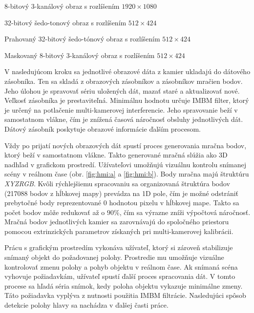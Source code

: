 \begin{description}[leftmargin=*, font=$\bullet$~\normalfont\scshape\color{black}]
	\item[RGB:] 	8-bitový 3-kanálový obraz s rozlíšením $1920 \times 1080$
	\item[IR:]	32-bitový šedo-tonový obraz s rozlíšením $512 \times 424$
	\item[Depth:] Prahovaný 32-bitový šedo-tónový obraz s rozlíšením $512 \times 424$
	\item[RGB-D:] Maskovaný 8-bitový 3-kanálový obraz s rozlíšením $512 \times 424$
\end{description}

V nasledujúcom kroku sa jednotlivé obrazové dáta z kamier ukladajú do dátového zásobníka. Ten sa skladá z obrazových zásobníkov a zásobníkov mračien bodov. Jeho úlohou je spravovať sériu uložených dát, mazať staré a aktualizovať nové. Veľkosť zásobníka je prestaviteľná. Minimálnu hodnotu určuje IMBM filter, ktorý je určený na potlačenie multi-kamerovej interferencie. Jeho spravovanie beží v samostatnom vlákne, čím je znížená časová náročnosť obsluhy jednotlivých dát. Dátový zásobník poskytuje obrazové informácie ďalším procesom. 

Vždy po prijatí nových obrazových dát spustí proces generovania mračna bodov, ktorý beží v samostatnom vlákne. Takto generované mračná slúžia ako 3D nadhľad v grafickom prostredí. Užívateľovi umožňujú vizuálnu kontrolu snímanej scény v reálnom čase (obr. \ref{fig:hmi:a} a \ref{fig:hmi:b}). Body mračna majú štruktúru \textit{XYZRGB}. Kvôli rýchlejšiemu spracovaniu sa organizovaná štruktúra bodov (217088 bodov z hĺbkovej mapy) prevádza na 1D pole, čím je možné odstrániť prebytočné body reprezentované 0 hodnotou pixelu v hĺbkovej mape. Takto sa počet bodov môže redukovať až o $90\%$, čím sa výrazne zníži výpočtová náročnosť. Mračná bodov jednotlivých kamier sa zarovnávajú do spoločného priestoru pomocou extrinzických parametrov získaných pri multi-kamerovej kalibrácii. 

Prácu s grafickým prostredím vykonáva užívateľ, ktorý si zároveň stabilizuje snímaný objekt do požadovanej polohy. Prostredie mu umožňuje vizuálne kontrolovať zmenu polohy a pohyb objektu v reálnom čase. Ak snímaná scéna vyhovuje požiadavkám, užívateľ spustí ďalší proces spracovania dát. V tomto procese sa hľadá séria snímok, kedy poloha objektu vykazuje minimálne zmeny. Táto požiadavka vyplýva z nutnosti použitia IMBM filtrácie. Nasledujúci spôsob detekcie polohy hlavy sa nachádza v ďalšej časti práce. 


